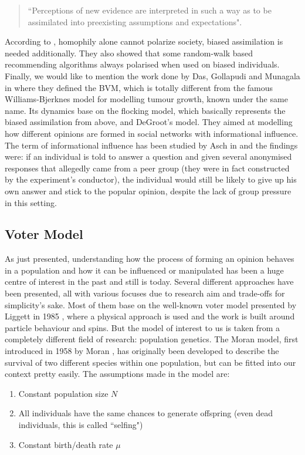 \documentclass[12pt,a4paper,twoside]{article}
\begin{document}
\begin{quote}
	``Perceptions of new evidence are interpreted in such a way as to be assimilated into preexisting assumptions and expectations".
\end{quote}

According to \cite{Dandekar2013}, homophily alone cannot polarize society, biased assimilation is needed additionally. They also showed that some random-walk based recommending algorithms always polarised when used on biased individuals. Finally, we would like to mention the work done by Das, Gollapudi and Munagala in \cite{Das2014} where they defined the \ac{BVM}, which is totally different from the famous Williams-Bjerknes model \cite{Williams1972} for modelling tumour growth, known under the same name. Its dynamics base on the flocking model, which basically represents the biased assimilation from above, and DeGroot's model. They aimed at modelling how different opinions are formed in social networks with informational influence. The term of informational influence has been studied by Asch in \cite{Asch1955} and the findings were: if an individual is told to answer a question and given several anonymised responses that allegedly came from a peer group (they were in fact constructed by the experiment's conductor), the individual would still be likely to give up his own answer and stick to the popular opinion, despite the lack of group pressure in this setting.

\subsection{Voter Model}\label{subsec:voter_model}
As just presented, understanding how the process of forming an opinion behaves in a population and how it can be influenced or manipulated has been a huge centre of interest in the past and still is today. Several different approaches have been presented, all with various focuses due to research aim and trade-offs for simplicity's sake. Most of them base on the well-known voter model presented by Liggett in 1985 \cite{Liggett1985}, where a physical approach is used and the work is built around particle behaviour and spins. But the model of interest to us is taken from a completely different field of research: population genetics. The Moran model, first introduced in 1958 by Moran \cite{Moran1958}, has originally been developed to describe the survival of two different species within one population, but can be fitted into our context pretty easily. The assumptions made in the model are:
\begin{enumerate}
	\item Constant population size $N$
	\item All individuals have the same chances to generate offspring (even dead individuals, this is called ``selfing")
	\item Constant birth/death rate $\mu$
\end{enumerate}
\end{document}
